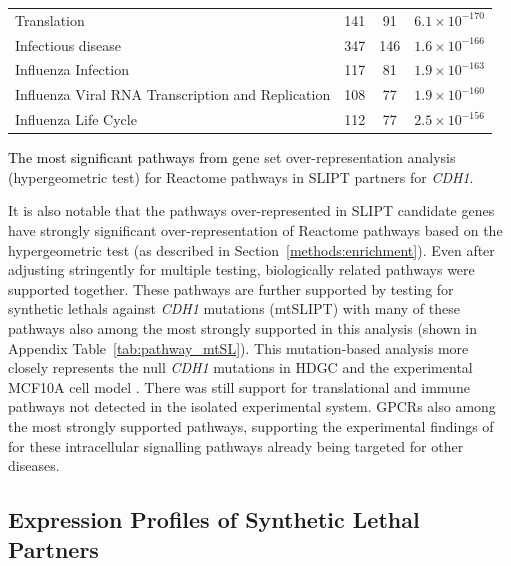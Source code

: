 \begin{table}[!ht]
{\begin{threeparttable}
\begin{tabular}{lccc}
  \rowcolor{black!5}
  Translation & 141 &  91 & $6.1 \times 10^{-170}$ \\ 
  \rowcolor{black!10}
  Infectious disease & 347 & 146 & $1.6 \times 10^{-166}$ \\ 
  \rowcolor{black!5}
  Influenza Infection & 117 &  81 & $1.9 \times 10^{-163}$ \\ 
  \rowcolor{black!10}
  Influenza Viral \acrshort{RNA} Transcription and Replication & 108 &  77 & $1.9 \times 10^{-160}$ \\ 
  \rowcolor{black!5}
  Influenza Life Cycle & 112 &  77 & $2.5 \times 10^{-156}$ \\ 
   \hline
\end{tabular}
\begin{tablenotes}
\raggedright %
\textcolor{black}{The most significant pathways from g}ene set over-representation analysis (hypergeometric test) for Reactome \glspl{pathway} in \gls{SLIPT} partners for \textit{CDH1}.
\end{tablenotes}
\end{threeparttable}
}
\end{table}

It is also notable that the \glspl{pathway} over-represented in \gls{SLIPT} candidate genes have strongly significant over-representation of Reactome \glspl{pathway} based on the hypergeometric test (as described in Section~\ref{methods:enrichment}). Even after adjusting stringently for multiple testing, biologically related \glspl{pathway} were supported together. These \glspl{pathway} are further supported by testing for \glspl{synthetic lethal} against \textit{CDH1} \glspl{mutation} (\acrshort{mtSLIPT}) with many of these \glspl{pathway} also among the most strongly supported in this analysis (shown in Appendix Table~\ref{tab:pathway_mtSL}). This \gls{mutation}-based analysis more closely represents the null \textit{CDH1} \glspl{mutation} in \gls{HDGC} \citep{Guilford1998} and the experimental MCF10A cell model \citep{Chen2014}. There was still support for translational and immune \glspl{pathway} not detected in the isolated experimental system.  \glspl{GPCR} also among the most strongly supported \glspl{pathway}, supporting the experimental findings of \citet{Telford2015} for these intracellular signalling \glspl{pathway} already being targeted for other diseases. 


\FloatBarrier


\subsection{Expression Profiles of Synthetic Lethal Partners} \label{chapt3:exprSL_clusters}

